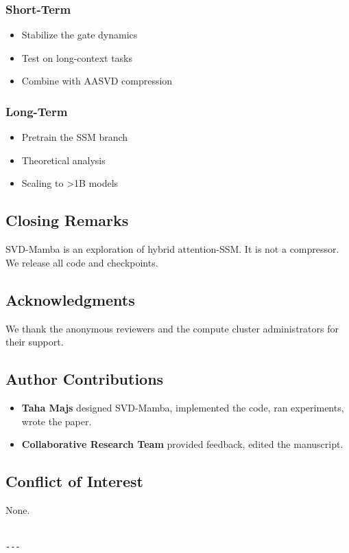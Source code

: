 \subsubsection{Short-Term}
\begin{itemize}
\item Stabilize the gate dynamics
\item Test on long-context tasks
\item Combine with AASVD compression

\end{itemize}
\subsubsection{Long-Term}
\begin{itemize}
\item Pretrain the SSM branch
\item Theoretical analysis
\item Scaling to \textgreater{}1B models

\end{itemize}
\subsection{Closing Remarks}

SVD-Mamba is an exploration of hybrid attention-SSM. It is not a 
compressor. We release all code and checkpoints.

\subsection{Acknowledgments}

We thank the anonymous reviewers and the compute cluster administrators for their support.

\subsection{Author Contributions}

\begin{itemize}
\item \textbf{Taha Majs} designed SVD-Mamba, implemented the code, ran
  experiments, wrote the paper.
\item \textbf{Collaborative Research Team} provided feedback, edited the manuscript.

\end{itemize}
\subsection{Conflict of Interest}

None.
\begin{lstlisting}

---
\end{lstlisting}